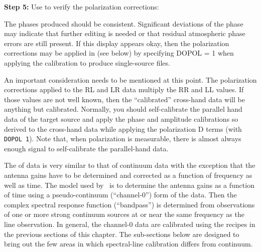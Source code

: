      {\bf Step 5:} Use {\tt {}} to verify the polarization
corrections:

      The phases produced should be consistent.  Significant
deviations of the phase may indicate that further editing is needed or
that residual atmospheric phase errors are still present.  If this
display appears okay, then the polarization corrections may be applied
in {\tt {}} (see below) by specifying {\us DOPOL = 1} when
applying the calibration to produce single-source files.

     An important consideration needs to be mentioned at this point.
The polarization corrections applied to the RL and LR data multiply
the RR and LL values.  If those values are not well known, then the
``calibrated'' cross-hand data will be anything but calibrated.
Normally, you should self-calibrate the parallel hand data of the
target source and apply the phase and amplitude calibrations so
derived to the cross-hand data while applying the polarization D terms
(with {\tt DOPOL 1})\@.  Note that, when polarization is measurable,
there is almost always enough signal to self-calibrate the
parallel-hand data.


     The  of  data is very
similar to that of continuum data with the exception that the antenna
gains have to be determined and corrected as a function of frequency
as well as time. The model used by \AIPS\ is to determine the antenna
gains as a function of time using a pseudo-continuum (``channel-0'')
form of the data.  Then the complex spectral response function
(``bandpass'') is determined from observations of one or more strong
continuum sources at or near the same frequency as the line
observation.  In general, the channel-0 data are calibrated using the
recipes in the previous sections of this chapter.  The sub-sections
below are designed to bring out the few areas in which spectral-line
calibration differs from continuum.

